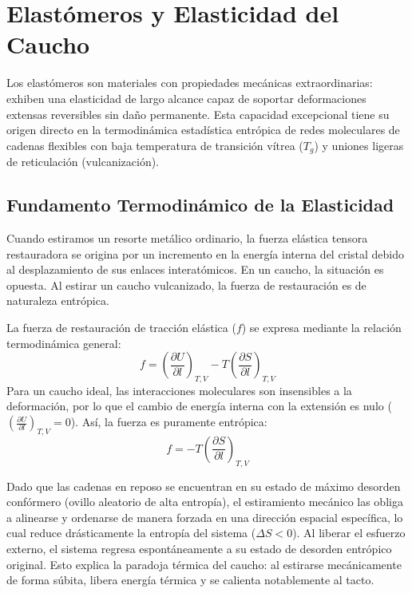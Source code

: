 \chapter{Elastómeros y Elasticidad del Caucho}
\label{cap:elastomeros}

Los elastómeros son materiales con propiedades mecánicas extraordinarias: exhiben una elasticidad de largo alcance capaz de soportar deformaciones extensas reversibles sin daño permanente. Esta capacidad excepcional tiene su origen directo en la termodinámica estadística entrópica de redes moleculares de cadenas flexibles con baja temperatura de transición vítrea ($T_g$) y uniones ligeras de reticulación (vulcanización).

\section{Fundamento Termodinámico de la Elasticidad}

Cuando estiramos un resorte metálico ordinario, la fuerza elástica tensora restauradora se origina por un incremento en la energía interna del cristal debido al desplazamiento de sus enlaces interatómicos. En un caucho, la situación es opuesta. Al estirar un caucho vulcanizado, la fuerza de restauración es de naturaleza entrópica.

La fuerza de restauración de tracción elástica ($f$) se expresa mediante la relación termodinámica general:
\begin{equation}
    f = \left( \frac{\partial U}{\partial l} \right)_{T, V} - T \left( \frac{\partial S}{\partial l} \right)_{T, V}
    \label{eq:termo_caucho}
\end{equation}
Para un caucho ideal, las interacciones moleculares son insensibles a la deformación, por lo que el cambio de energía interna con la extensión es nulo ($\left( \frac{\partial U}{\partial l} \right)_{T, V} = 0$). Así, la fuerza es puramente entrópica:
\begin{equation}
    f = - T \left( \frac{\partial S}{\partial l} \right)_{T, V}
    \label{eq:fuerza_entropica}
\end{equation}

Dado que las cadenas en reposo se encuentran en su estado de máximo desorden confórmero (ovillo aleatorio de alta entropía), el estiramiento mecánico las obliga a alinearse y ordenarse de manera forzada en una dirección espacial específica, lo cual reduce drásticamente la entropía del sistema ($\Delta S < 0$). Al liberar el esfuerzo externo, el sistema regresa espontáneamente a su estado de desorden entrópico original. Esto explica la paradoja térmica del caucho: al estirarse mecánicamente de forma súbita, libera energía térmica y se calienta notablemente al tacto.

